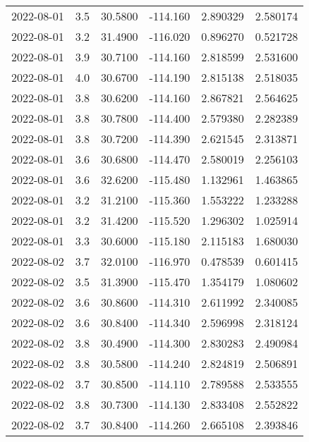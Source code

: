 \begin{tabular}{lrrrrr}
2022-08-01 &       3.5 &  30.5800 &  -114.160 &         2.890329 &         2.580174 \\
2022-08-01 &       3.2 &  31.4900 &  -116.020 &         0.896270 &         0.521728 \\
2022-08-01 &       3.9 &  30.7100 &  -114.160 &         2.818599 &         2.531600 \\
2022-08-01 &       4.0 &  30.6700 &  -114.190 &         2.815138 &         2.518035 \\
2022-08-01 &       3.8 &  30.6200 &  -114.160 &         2.867821 &         2.564625 \\
2022-08-01 &       3.8 &  30.7800 &  -114.400 &         2.579380 &         2.282389 \\
2022-08-01 &       3.8 &  30.7200 &  -114.390 &         2.621545 &         2.313871 \\
2022-08-01 &       3.6 &  30.6800 &  -114.470 &         2.580019 &         2.256103 \\
2022-08-01 &       3.6 &  32.6200 &  -115.480 &         1.132961 &         1.463865 \\
2022-08-01 &       3.2 &  31.2100 &  -115.360 &         1.553222 &         1.233288 \\
2022-08-01 &       3.2 &  31.4200 &  -115.520 &         1.296302 &         1.025914 \\
2022-08-01 &       3.3 &  30.6000 &  -115.180 &         2.115183 &         1.680030 \\
2022-08-02 &       3.7 &  32.0100 &  -116.970 &         0.478539 &         0.601415 \\
2022-08-02 &       3.5 &  31.3900 &  -115.470 &         1.354179 &         1.080602 \\
2022-08-02 &       3.6 &  30.8600 &  -114.310 &         2.611992 &         2.340085 \\
2022-08-02 &       3.6 &  30.8400 &  -114.340 &         2.596998 &         2.318124 \\
2022-08-02 &       3.8 &  30.4900 &  -114.300 &         2.830283 &         2.490984 \\
2022-08-02 &       3.8 &  30.5800 &  -114.240 &         2.824819 &         2.506891 \\
2022-08-02 &       3.7 &  30.8500 &  -114.110 &         2.789588 &         2.533555 \\
2022-08-02 &       3.8 &  30.7300 &  -114.130 &         2.833408 &         2.552822 \\
2022-08-02 &       3.7 &  30.8400 &  -114.260 &         2.665108 &         2.393846 \\

\end{tabular}
